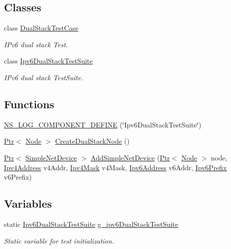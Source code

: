 \subsection*{Classes}
\begin{DoxyCompactItemize}
\item 
class \hyperlink{classDualStackTestCase}{Dual\+Stack\+Test\+Case}
\begin{DoxyCompactList}\small\item\em I\+Pv6 dual stack Test. \end{DoxyCompactList}\item 
class \hyperlink{classIpv6DualStackTestSuite}{Ipv6\+Dual\+Stack\+Test\+Suite}
\begin{DoxyCompactList}\small\item\em I\+Pv6 dual stack Test\+Suite. \end{DoxyCompactList}\end{DoxyCompactItemize}
\subsection*{Functions}
\begin{DoxyCompactItemize}
\item 
\hyperlink{ipv6-dual-stack-test-suite_8cc_aadc4313d97daf7afea7e8eefd0ada0cd}{N\+S\+\_\+\+L\+O\+G\+\_\+\+C\+O\+M\+P\+O\+N\+E\+N\+T\+\_\+\+D\+E\+F\+I\+NE} (\char`\"{}Ipv6\+Dual\+Stack\+Test\+Suite\char`\"{})
\item 
\hyperlink{classns3_1_1Ptr}{Ptr}$<$ \hyperlink{classns3_1_1Node}{Node} $>$ \hyperlink{ipv6-dual-stack-test-suite_8cc_a27cadab775ef9861b30e3ad79a3e3214}{Create\+Dual\+Stack\+Node} ()
\item 
\hyperlink{classns3_1_1Ptr}{Ptr}$<$ \hyperlink{classns3_1_1SimpleNetDevice}{Simple\+Net\+Device} $>$ \hyperlink{ipv6-dual-stack-test-suite_8cc_ae9689e23d0a3932740b53b4c856238ee}{Add\+Simple\+Net\+Device} (\hyperlink{classns3_1_1Ptr}{Ptr}$<$ \hyperlink{classns3_1_1Node}{Node} $>$ node, \hyperlink{classns3_1_1Ipv4Address}{Ipv4\+Address} v4\+Addr, \hyperlink{classns3_1_1Ipv4Mask}{Ipv4\+Mask} v4\+Mask, \hyperlink{classns3_1_1Ipv6Address}{Ipv6\+Address} v6\+Addr, \hyperlink{classns3_1_1Ipv6Prefix}{Ipv6\+Prefix} v6\+Prefix)
\end{DoxyCompactItemize}
\subsection*{Variables}
\begin{DoxyCompactItemize}
\item 
static \hyperlink{classIpv6DualStackTestSuite}{Ipv6\+Dual\+Stack\+Test\+Suite} \hyperlink{ipv6-dual-stack-test-suite_8cc_acf192e06147b4876fcc0c98c4f7db273}{g\+\_\+ipv6\+Dual\+Stack\+Test\+Suite}
\begin{DoxyCompactList}\small\item\em Static variable for test initialization. \end{DoxyCompactList}\end{DoxyCompactItemize}


